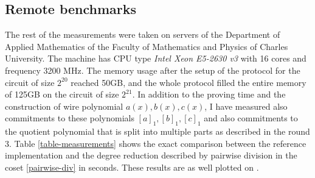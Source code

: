 \subsection{Remote benchmarks}
The rest of the measurements were taken on servers of the Department of Applied Mathematics of the Faculty of Mathematics and Physics of Charles University. The machine has CPU type \textit{Intel Xeon E5-2630 v3} with 16 cores and frequency 3200 MHz. The memory usage after the setup of the protocol for the circuit of size $2^{20}$ reached 50GB, and the whole protocol filled the entire memory of 125GB on the circuit of size $2^{21}$. In addition to the proving time and the construction of wire polynomial $a(x), b(x), c(x)$, I have measured also commitments to these polynomials $[a]_1, [b]_1, [c]_1$ and also commitments to the quotient polynomial that is split into multiple parts as described in the round 3. Table \ref{table-measurements} shows the exact comparison between the reference implementation and the degree reduction described by pairwise division in the coset \ref{pairwise-div} in seconds. These results are as well plotted on .


